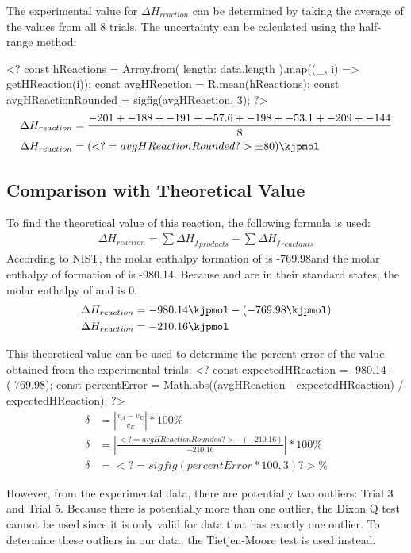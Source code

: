 \documentclass[12pt, notitlepage, letterpaper]{report}
\begin{document}
The experimental value for $\Delta H_{reaction}$ can be determined by taking the average of the values from all 8 trials. The uncertainty can be calculated using the half-range method:
\vspace{5pt}

<?
const hReactions = Array.from({ length: data.length }).map((_, i) => getHReaction(i));
const avgHReaction = R.mean(hReactions);
const avgHReactionRounded = sigfig(avgHReaction, 3);
?>
%
\begin{align*}
	\Delta H_{reaction} & = \frac{-201 + -188 + -191 + -57.6 + -198 + -53.1 + -209 + -144}{8} \\
	\Delta H_{reaction} & = (<?= avgHReactionRounded ?> \pm 80)\kjpmol
\end{align*}

\subsection*{Comparison with Theoretical Value}
To find the theoretical value of this reaction, the following formula is used:
%
\begin{align*}
	\Delta H_{reaction} = \sum \Delta {H_f}_{products} - \sum \Delta {H_f}_{reactants}
\end{align*}
%
According to NIST, the molar enthalpy formation of  is -769.98\kjpmol and the molar enthalpy of formation of  is -980.14\kjpmol . Because  and  are in their standard states, the molar enthalpy of  and  is 0\kjpmol .
\begin{align*}
	\Delta H_{reaction} & = -980.14\kjpmol - (-769.98\kjpmol) \\
	\Delta H_{reaction} & = -210.16\kjpmol
\end{align*}

This theoretical value can be used to determine the percent error of the value obtained from the experimental trials:
%
<?
const expectedHReaction = -980.14 - (-769.98);
const percentError = Math.abs((avgHReaction - expectedHReaction) / expectedHReaction);
?>
%
\begin{align*}
	\delta & = |\frac{v_A - v_E}{v_E}| * 100\%                                  \\
	\delta & = |\frac{<?= avgHReactionRounded ?> - (-210.16)}{-210.16}| * 100\% \\
	\delta & = <?= sigfig(percentError * 100, 3) ?>\%
\end{align*}

However, from the experimental data, there are potentially two outliers: Trial 3 and Trial 5. Because there is potentially more than one outlier, the Dixon Q test cannot be used since it is only valid for data that has exactly one outlier. To determine these outliers in our data, the Tietjen-Moore test is used instead.
\end{document}
